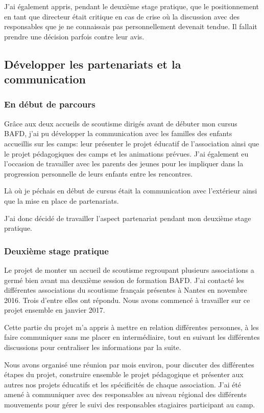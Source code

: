 \documentclass[titlepage,11pt,a4paper]{article}
\begin{document}
J'ai également appris, pendant le deuxième stage pratique, que le positionnement en tant
que directeur était critique en cas de crise où la discussion avec des responsables que je
ne connaissais pas personnellement devenait tendue. Il fallait prendre une décision
parfois contre leur avis.


\subsection{Développer les partenariats et la communication}
\subsubsection{En début de parcours}

Grâce aux deux accueils de scoutisme dirigés avant de débuter mon cursus BAFD, j'ai
pu développer la communication avec les familles des enfants accueillis sur les camps:
leur présenter le projet éducatif de l'association ainsi que le projet pédagogiques des
camps et les animations prévues. J'ai également eu l'occasion de travailler avec les parents des jeunes pour les impliquer
dans la progression personnelle de leurs enfants entre les rencontres.

Là où je péchais en début de cursus était la communication avec l'extérieur ainsi que la
mise en place de partenariats.

J'ai donc décidé de travailler l'aspect partenariat pendant mon deuxième stage pratique.

\subsubsection{Deuxième stage pratique}

Le projet de monter un accueil de scoutisme regroupant plusieurs associations a germé bien avant ma
deuxième session de formation BAFD\@. J'ai contacté les différentes associations du
scoutisme français présentes à Nantes en novembre 2016. Trois d'entre elles ont répondu.
Nous avons commencé à travailler sur ce projet ensemble en janvier 2017.

Cette partie du projet m'a appris à mettre en relation différentes personnes, à les faire
communiquer sans me placer en intermédiaire, tout en suivant les différentes discussions
pour centraliser les informations par la suite.

Nous avons organisé une réunion par mois environ, pour discuter des différentes étapes du
projet, construire ensemble le projet pédagogique et présenter aux autres nos projets
éducatifs et les spécificités de chaque association. J'ai été amené à communiquer avec des
responsables au niveau régional des différents mouvements pour gérer le suivi des
responsables stagiaires participant au camp.
\end{document}
